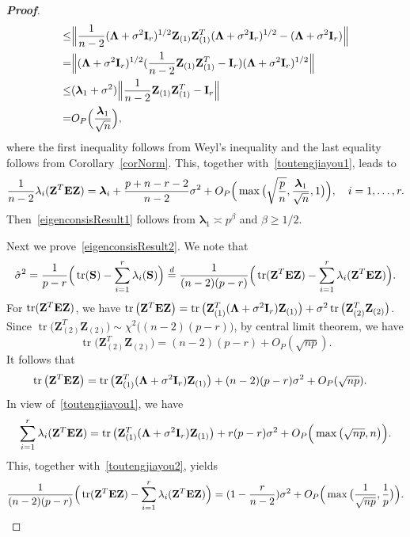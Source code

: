 \documentclass[3p]{elsarticle}
\DeclareMathOperator{\mytr}{tr}
\newcommand{\bZ}{\mathbf{Z}}
\newcommand{\bfsym}[1]{\ensuremath{\boldsymbol{#1}}}
\def\blambda {\bfsym {\lambda}}        \def\bLambda {\bfsym {\Lambda}}
\theoremstyle{plain}
\theoremstyle{definition}
\theoremstyle{remark}
\begin{document}
\begin{appendices}
\begin{proof}[\textbf{Proof}]
$$\begin{aligned}
        \leq &
        \Big\|
        \frac{1}{n-2}(\bLambda+\sigma^2 \BI_r)^{1/2}\bZ_{(1)}\bZ_{(1)}^T(\bLambda+\sigma^2 \BI_r)^{1/2}
        -(\bLambda+\sigma^2 \BI_r)
        \Big\|\\
        = &
        \Big\|
        (\bLambda+\sigma^2 \BI_r)^{1/2}(\frac{1}{n-2}\bZ_{(1)}\bZ_{(1)}^T-\BI_r)(\bLambda+\sigma^2 \BI_r)^{1/2}
        \Big\|\\
        \leq &
        (\blambda_1 + \sigma^2)
        \Big\|\frac{1}{n-2}\bZ_{(1)}\bZ_{(1)}^T-\BI_r\Big\|\\
        = &
        O_P\Big(\frac{\blambda_1}{\sqrt{n}}\Big),
    \end{aligned}
    $$
    where the first inequality follows from Weyl's inequality and the last equality follows from Corollary~\ref{corNorm}.
    This, together with~\eqref{toutengjiayou1}, leads to
$$
\frac{1}{n-2}\lambda_i(\BZ^T \BE \BZ)=
\blambda_i+\frac{p+n-r-2}{n-2}\sigma^2+O_P\Big(\max\big(\sqrt{\frac{p}{n}},\frac{\blambda_1}{\sqrt{n}},1\big)\Big),\quad i=1,\ldots, r.
$$
Then~\eqref{eigenconsisResult1} follows from $\blambda_1\asymp p^{\beta}$ and $\beta\geq 1/2$.
    
    Next we prove~\eqref{eigenconsisResult2}.
    We note that
    $$
    \hat{\sigma}^2=\frac{1}{p-r}\Big(\mytr(\BS)-\sum_{i=1}^r \lambda_i(\BS)\Big)
    \overset{d}{=}
\frac{1}{(n-2)(p-r)}\Big(\mytr(\BZ^T \BE \BZ)-\sum_{i=1}^r \lambda_i(\BZ^T \BE \BZ)\Big).
    $$
    For $\mytr(\BZ^T \BE \BZ)$, we have
    $
            \mytr\big(\bZ^T \BE \bZ\big)= \mytr\big(\bZ_{(1)}^T (\bLambda +\sigma^2 \BI_r) \bZ_{(1)}\big)+
       \sigma^2 \mytr\big( \bZ_{(2)}^T  \bZ_{(2)}\big)
    $.
    Since $\mytr\big( \bZ_{(2)}^T  \bZ_{(2)}\big)\sim \chi^2\big( (n-2)(p-r)\big)$, by central limit theorem, we have
    $$\mytr\big( \bZ_{(2)}^T  \bZ_{(2)}\big)=(n-2)(p-r)+O_P(\sqrt{np}).$$
    It follows that
    \begin{equation}\label{toutengjiayou2}
        \begin{aligned}
            \mytr\big(\bZ^T \BE \bZ\big)&= \mytr\big(\bZ_{(1)}^T (\bLambda +\sigma^2 \BI_r) \bZ_{(1)}\big)+
            (n-2)(p-r)\sigma^2+O_P(\sqrt{np}).
        \end{aligned}
    \end{equation}
    In view of~\eqref{toutengjiayou1}, we have
    $$
\sum_{i=1}^r\lambda_i(\BZ^T \BE \BZ)
=\mytr\big(\BZ_{(1)}^T (\bLambda+\sigma^2 \BI_r)\BZ_{(1)}\big)
+r(p-r)\sigma^2
+
O_P\Big(\max\big(\sqrt{np},n\big)\Big).
    $$
    This, together with~\eqref{toutengjiayou2}, yields
    $$
\frac{1}{(n-2)(p-r)}\Big(\mytr(\BZ^T \BE \BZ)-\sum_{i=1}^r \lambda_i(\BZ^T \BE \BZ)\Big)=
(1-\frac{r}{n-2})\sigma^2+
O_P\Big(\max\big(\frac{1}{\sqrt{np}},\frac{1}{p}\big)\Big).
    $$
\end{proof}


\end{appendices}
\end{document}
